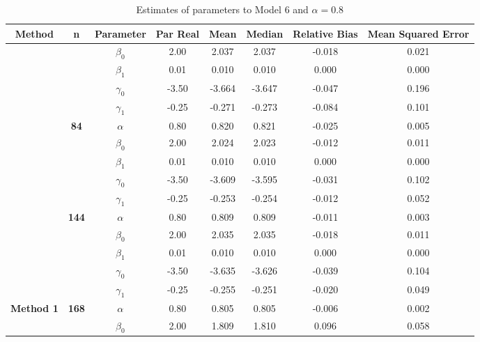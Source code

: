 \begin{table}[h]

\caption{\label{tab:Est_model_6_Alpha0.8}Estimates of parameters to Model 6 and $\alpha=0.8$}
\centering
\begin{tabular}[t]{>{}c>{}ccccccc}
\toprule
Method & n & Parameter & Par Real & Mean & Median & Relative Bias & Mean Squared Error\\
\midrule
 &  & $\beta_0$ & 2.00 & 2.037 & 2.037 & -0.018 & 0.021\\

 &  & $\beta_1$ & 0.01 & 0.010 & 0.010 & 0.000 & 0.000\\

 &  & $\gamma_0$ & -3.50 & -3.664 & -3.647 & -0.047 & 0.196\\

 &  & $\gamma_1$ & -0.25 & -0.271 & -0.273 & -0.084 & 0.101\\

 & \multirow{-5}{*}{\centering\arraybackslash \textbf{84}} & $\alpha$ & 0.80 & 0.820 & 0.821 & -0.025 & 0.005\\

 &  & $\beta_0$ & 2.00 & 2.024 & 2.023 & -0.012 & 0.011\\

 &  & $\beta_1$ & 0.01 & 0.010 & 0.010 & 0.000 & 0.000\\

 &  & $\gamma_0$ & -3.50 & -3.609 & -3.595 & -0.031 & 0.102\\

 &  & $\gamma_1$ & -0.25 & -0.253 & -0.254 & -0.012 & 0.052\\

 & \multirow{-5}{*}{\centering\arraybackslash \textbf{144}} & $\alpha$ & 0.80 & 0.809 & 0.809 & -0.011 & 0.003\\

 &  & $\beta_0$ & 2.00 & 2.035 & 2.035 & -0.018 & 0.011\\

 &  & $\beta_1$ & 0.01 & 0.010 & 0.010 & 0.000 & 0.000\\

 &  & $\gamma_0$ & -3.50 & -3.635 & -3.626 & -0.039 & 0.104\\

 &  & $\gamma_1$ & -0.25 & -0.255 & -0.251 & -0.020 & 0.049\\

\multirow{-15}{*}{\centering\arraybackslash \textbf{Method 1}} & \multirow{-5}{*}{\centering\arraybackslash \textbf{168}} & $\alpha$ & 0.80 & 0.805 & 0.805 & -0.006 & 0.002\\
\cmidrule{1-8}
 &  & $\beta_0$ & 2.00 & 1.809 & 1.810 & 0.096 & 0.058\\


\end{tabular}
\end{table}

